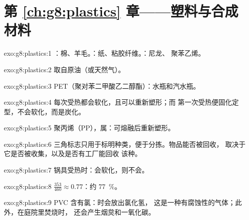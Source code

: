 \section*{第 \ref{ch:g8:plastics} 章——塑料与合成材料}

\begin{solution}{exo:g8:plastics:1}
：棉、羊毛。：纸、粘胶纤维。：尼龙、
聚苯乙烯。
\end{solution}

\begin{solution}{exo:g8:plastics:2}
取自原油（或天然气）。
\end{solution}

\begin{solution}{exo:g8:plastics:3}
PET（聚对苯二甲酸乙二醇酯）：水瓶和汽水瓶。
\end{solution}

\begin{solution}{exo:g8:plastics:4}
每次受热都会软化，且可以重新塑形；而
第一次受热便固化定型，不会软化，而是炭化。
\end{solution}

\begin{solution}{exo:g8:plastics:5}
聚丙烯（PP），属：可熔融后重新塑形。
\end{solution}

\begin{solution}{exo:g8:plastics:6}
三角标志只用于标明种类，便于分拣。物品能否被回收，
取决于它是否被收集，以及是否有工厂能回收
该种。
\end{solution}

\begin{solution}{exo:g8:plastics:7}
锅具受热时：会软化，则不会。
\end{solution}

\begin{solution}{exo:g8:plastics:8}
$\frac{353}{460} \approx 0.77$：约 \qty{77}{\percent}。
\end{solution}

\begin{solution}{exo:g8:plastics:9}
PVC 含有氯：时会放出氯化氢，
这是一种有腐蚀性的气体；此外，在庭院里焚烧时，
还会产生烟炱和一氧化碳。
\end{solution}

